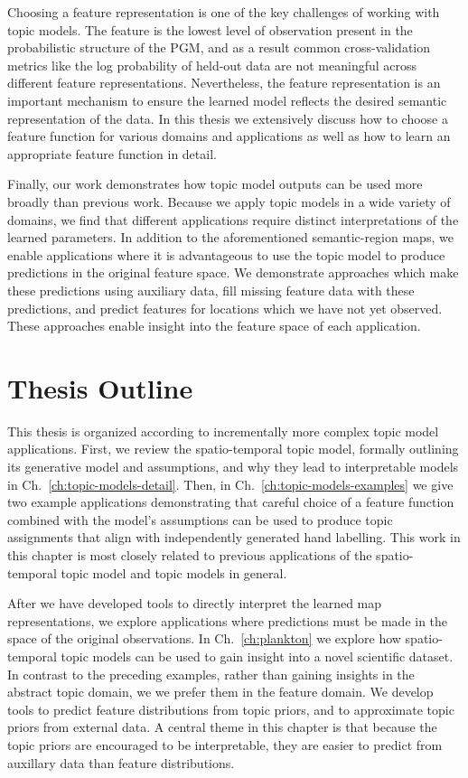 Choosing a feature representation is one of the key challenges of working with topic models. The feature is the lowest level of observation present in the probabilistic structure of the PGM, and as a result common cross-validation metrics like the log probability of held-out data are not meaningful across different feature representations. Nevertheless, the feature representation is an important mechanism to ensure the learned model reflects the desired semantic representation of the data. In this thesis we extensively discuss how to choose a feature function for various domains and applications as well as how to learn an appropriate feature function in detail.

Finally, our work demonstrates how topic model outputs can be used more broadly than previous work. Because we apply topic models in a wide variety of domains, we find that different applications require distinct interpretations of the learned parameters. In addition to the aforementioned semantic-region maps, we enable applications where it is advantageous to use the topic model to produce predictions in the original feature space. We demonstrate approaches which make these predictions using auxiliary data, fill missing feature data with these predictions, and predict features for locations which we have not yet observed. These approaches enable insight into the feature space of each application.

\section{Thesis Outline}

This thesis is organized according to incrementally more complex topic model applications.
First, we review the spatio-temporal topic model, formally outlining its generative model and assumptions, and why they lead to interpretable models in Ch.~\ref{ch:topic-models-detail}. Then, in Ch.~\ref{ch:topic-models-examples} we give two example applications demonstrating that careful choice of a feature function combined with the model's assumptions can be used to produce topic assignments that align with independently generated hand labelling. This work in this chapter is most closely related to previous applications of the spatio-temporal topic model and topic models in general.

After we have developed tools to directly interpret the learned map representations, we explore applications where predictions must be made in the space of the original observations. In Ch.~\ref{ch:plankton} we explore how spatio-temporal topic models can be used to gain insight into a novel scientific dataset. In contrast to the preceding examples, rather than gaining insights in the abstract topic domain, we we prefer them in the feature domain. We develop tools to predict feature distributions from topic priors, and to approximate topic priors from external data. A central theme in this chapter is that because the topic priors are encouraged to be interpretable, they are easier to predict from auxillary data than feature distributions.

